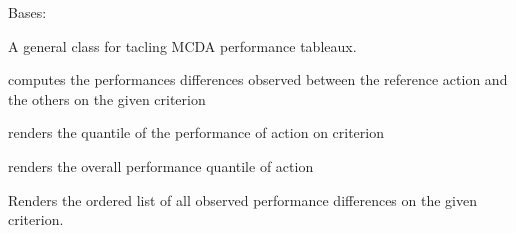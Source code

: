 \documentclass[letterpaper,10pt,english]{sphinxmanual}
\begin{document}
\begin{fulllineitems}
\label{techDoc:perfTabs.PerformanceTableau}
Bases: 

A general class for tacling MCDA performance tableaux.

\begin{fulllineitems}
\label{techDoc:perfTabs.PerformanceTableau.computeActionCriterionPerformanceDifferences}
computes the performances differences observed between the reference action and the others on the given criterion

\end{fulllineitems}


\begin{fulllineitems}
\label{techDoc:perfTabs.PerformanceTableau.computeActionCriterionQuantile}
renders the quantile of the performance of action on criterion

\end{fulllineitems}


\begin{fulllineitems}
\label{techDoc:perfTabs.PerformanceTableau.computeActionQuantile}
renders the overall performance quantile of action

\end{fulllineitems}


\begin{fulllineitems}
\label{techDoc:perfTabs.PerformanceTableau.computeCriterionPerformanceDifferences}
Renders the ordered list of all observed performance differences on the given criterion.


\end{fulllineitems}
\end{fulllineitems}
\end{document}

